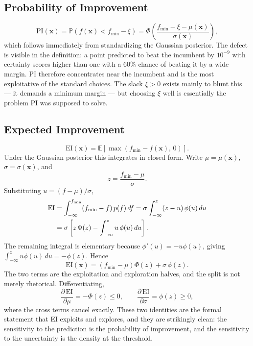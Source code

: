 \documentclass[conference]{IEEEtran}
\begin{document}
\subsection*{Probability of Improvement}
\begin{equation}
    \mathrm{PI}(\mathbf{x}) = \mathbb{P}\!\left(f(\mathbf{x}) < f_{\min} - \xi\right)
    = \Phi\!\left(\frac{f_{\min} - \xi - \mu(\mathbf{x})}{\sigma(\mathbf{x})}\right),
\end{equation}
which follows immediately from standardizing the Gaussian posterior. The defect is visible in the definition: a point predicted to beat the incumbent by $10^{-9}$ with certainty scores higher than one with a 60\% chance of beating it by a wide margin. PI therefore concentrates near the incumbent and is the most exploitative of the standard choices. The slack $\xi > 0$ exists mainly to blunt this --- it demands a minimum margin --- but choosing $\xi$ well is essentially the problem PI was supposed to solve.

\subsection*{Expected Improvement}
\begin{equation}
    \mathrm{EI}(\mathbf{x}) = \mathbb{E}\!\left[\max\!\left(f_{\min} - f(\mathbf{x}),\, 0\right)\right].
\end{equation}
Under the Gaussian posterior this integrates in closed form. Write $\mu = \mu(\mathbf{x})$, $\sigma = \sigma(\mathbf{x})$, and
\begin{equation}
    z = \frac{f_{\min} - \mu}{\sigma}.
\end{equation}
Substituting $u = (f-\mu)/\sigma$,
\begin{align}
    \mathrm{EI} &= \int_{-\infty}^{f_{\min}} (f_{\min} - f)\, p(f)\, df
     = \sigma \int_{-\infty}^{z} (z - u)\,\phi(u)\, du \notag \\
    &= \sigma\left[z\,\Phi(z) - \int_{-\infty}^{z} u\,\phi(u)\, du\right].
\end{align}
The remaining integral is elementary because $\phi'(u) = -u\phi(u)$, giving $\int_{-\infty}^{z} u\phi(u)\,du = -\phi(z)$. Hence
\begin{equation}
    \boxed{\;\mathrm{EI}(\mathbf{x}) = \left(f_{\min} - \mu\right)\Phi(z) + \sigma\,\phi(z).\;}
\end{equation}
The two terms are the exploitation and exploration halves, and the split is not merely rhetorical. Differentiating,
\begin{equation}
    \frac{\partial\,\mathrm{EI}}{\partial \mu} = -\Phi(z) \leq 0,
    \qquad
    \frac{\partial\,\mathrm{EI}}{\partial \sigma} = \phi(z) \geq 0,
\end{equation}
where the cross terms cancel exactly. These two identities are the formal statement that EI exploits and explores, and they are strikingly clean: the sensitivity to the prediction is the probability of improvement, and the sensitivity to the uncertainty is the density at the threshold.
\end{document}
